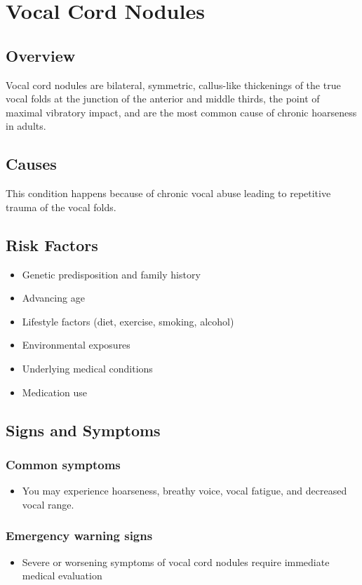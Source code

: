 \chapter{Vocal Cord Nodules}
\label{sec:Vocal Cord Nodules}

\section{Overview}
Vocal cord nodules are bilateral, symmetric, callus-like thickenings of the true vocal folds at the junction of the anterior and middle thirds, the point of maximal vibratory impact, and are the most common cause of chronic hoarseness in adults.
\section{Causes}
This condition happens because of chronic vocal abuse leading to repetitive trauma of the vocal folds.     
\section{Risk Factors}

\begin{itemize}[noitemsep]
  \item Genetic predisposition and family history
  \item Advancing age
  \item Lifestyle factors (diet, exercise, smoking, alcohol)
  \item Environmental exposures
  \item Underlying medical conditions
  \item Medication use
\end{itemize}
\section{Signs and Symptoms}

\subsection{Common symptoms}
\begin{itemize}[noitemsep]
  \item You may experience hoarseness, breathy voice, vocal fatigue, and decreased vocal range. 
  \end{itemize}

\subsection{Emergency warning signs}
\begin{itemize}[noitemsep]
  \item Severe or worsening symptoms of vocal cord nodules require immediate medical evaluation
\end{itemize}
